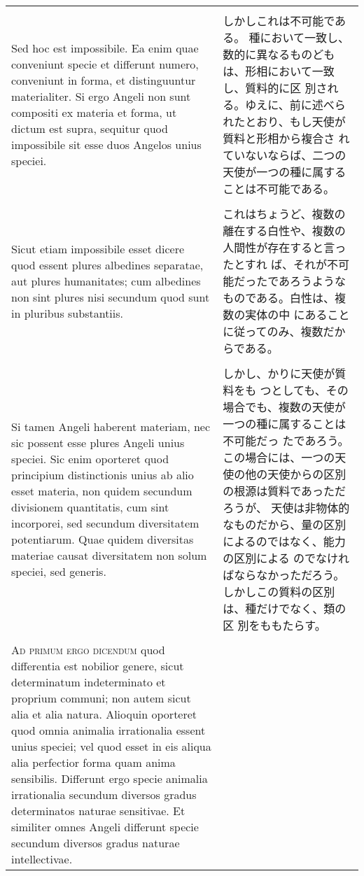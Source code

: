 \documentclass[10pt]{jsarticle} %
\begin{document}
\begin{longtable}{p{21em}p{21em}}
\\\\

Sed hoc est
impossibile. 
Ea enim quae conveniunt specie et differunt numero,
conveniunt in forma, et distinguuntur materialiter. Si ergo Angeli non
sunt compositi ex materia et forma, ut dictum est supra, sequitur quod
impossibile sit esse duos Angelos unius speciei. 


&

しかしこれは不可能である。
種において一致し、数的に異なるものどもは、形相において一致し、質料的に区
 別される。ゆえに、前に述べられたとおり、もし天使が質料と形相から複合さ
 れていないならば、二つの天使が一つの種に属することは不可能である。


\\\\


Sicut etiam impossibile
esset dicere quod essent plures albedines separatae, aut plures
humanitates; cum albedines non sint plures nisi secundum quod sunt in
pluribus substantiis. 






&

これはちょうど、複数の離在する白性や、複数の人間性が存在すると言ったとすれ
 ば、それが不可能だったであろうようなものである。白性は、複数の実体の中
 にあることに従ってのみ、複数だからである。


\\\\

Si tamen Angeli haberent materiam, nec sic possent
esse plures Angeli unius speciei. 
Sic enim oporteret quod principium
distinctionis unius ab alio esset materia, non quidem secundum
divisionem quantitatis, cum sint incorporei, sed secundum diversitatem
potentiarum. Quae quidem diversitas materiae causat diversitatem non
solum speciei, sed generis.


&

しかし、かりに天使が質料をも
 つとしても、その場合でも、複数の天使が一つの種に属することは不可能だっ
 たであろう。
この場合には、一つの天使の他の天使からの区別の根源は質料であっただろうが、
 天使は非物体的なものだから、量の区別によるのではなく、能力の区別による
 のでなければならなかっただろう。しかしこの質料の区別は、種だけでなく、類の区
 別をももたらす。


\\\\


{\scshape Ad primum ergo dicendum} quod differentia est
nobilior genere, sicut determinatum indeterminato et proprium communi;
non autem sicut alia et alia natura. Alioquin oporteret quod omnia
animalia irrationalia essent unius speciei; vel quod esset in eis aliqua
alia perfectior forma quam anima sensibilis. Differunt ergo specie
animalia irrationalia secundum diversos gradus determinatos naturae
sensitivae. Et similiter omnes Angeli differunt specie secundum diversos
gradus naturae intellectivae.



\end{longtable}
\end{document}
